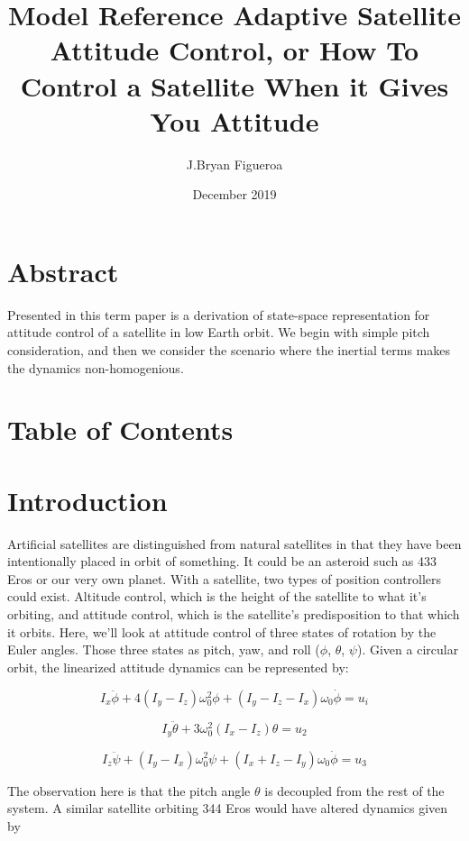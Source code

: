 \documentclass{article}
\title{Model Reference Adaptive Satellite Attitude Control, or How To Control a Satellite When it Gives You Attitude}
\author{J.Bryan Figueroa}
\date{December 2019}
\begin{document}
\maketitle
\section{Abstract}
Presented in this term paper is a derivation of state-space representation for attitude control of a satellite in low Earth orbit.
We begin with simple pitch consideration, and then we consider the scenario where the inertial terms makes the dynamics non-homogenious.
\section{Table of Contents}
\section{Introduction}
Artificial satellites are distinguished from natural satellites in that they have been intentionally placed in orbit of something.
It could be an asteroid such as 433 Eros or our very own planet.
With a satellite, two types of position controllers could exist.
Altitude control, which is the height of the satellite to what it's orbiting, and attitude control, which is the satellite's predisposition to that which it orbits.
Here, we'll look at attitude control of three states of rotation by the Euler angles.
Those three states as pitch, yaw, and roll ($\phi$, $\theta$, $\psi$).
Given a circular orbit, the linearized attitude dynamics can be represented by:

\begin{equation}
I_{x} \ddot{\phi} +4(I_{y}-I_{z})\omega^{2}_{0}\phi+(I_{y}-I_{z}-I_{x})\omega_{0}\dot{\phi} = u_{i}
\end{equation}

\begin{equation}
I_{y}\ddot{\theta}+3\omega^{2}_{0}(I_{x}-I_{z})\theta = u_{2}
\end{equation}

\begin{equation}
I_{z}\ddot{\psi}+(I_{y}-I_{x})\omega^{2}_{0}\psi + (I_{x} + I_{z} - I_{y})\omega_{0}\dot{\phi} = u_3
\end{equation}

The observation here is that the pitch angle $\theta$ is decoupled from the rest of the system.
A similar satellite orbiting 344 Eros would have altered dynamics given by
\end{document}

